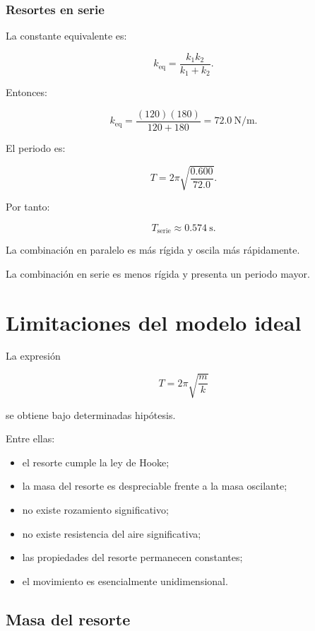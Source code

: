 \subsubsection*{Resortes en serie}

La constante equivalente es:

\[ k_{\mathrm{eq}}=\frac{k_1k_2}{k_1+k_2}. \]

Entonces:

\[
k_{\mathrm{eq}}
=
\frac{(120)(180)}{120+180}
=
\SI{72.0}{\newton\per\meter}.
\]

El periodo es:

\[
T
=
2\pi
\sqrt{
\frac{0.600}{72.0}
}.
\]

Por tanto:

\[ \boxed{T_{\mathrm{serie}}\approx\SI{0.574}{\second}}. \]

\begin{interpretacion}
La combinación en paralelo es más rígida y oscila más rápidamente.

La combinación en serie es menos rígida y presenta un periodo mayor.
\end{interpretacion}


\section{Limitaciones del modelo ideal}

La expresión

\[ T=2\pi\sqrt{\frac{m}{k}} \]

se obtiene bajo determinadas hipótesis.

Entre ellas:

\begin{itemize}
    \item el resorte cumple la ley de Hooke;
    \item la masa del resorte es despreciable frente a la masa oscilante;
    \item no existe rozamiento significativo;
    \item no existe resistencia del aire significativa;
    \item las propiedades del resorte permanecen constantes;
    \item el movimiento es esencialmente unidimensional.
\end{itemize}


\subsection{Masa del resorte}

